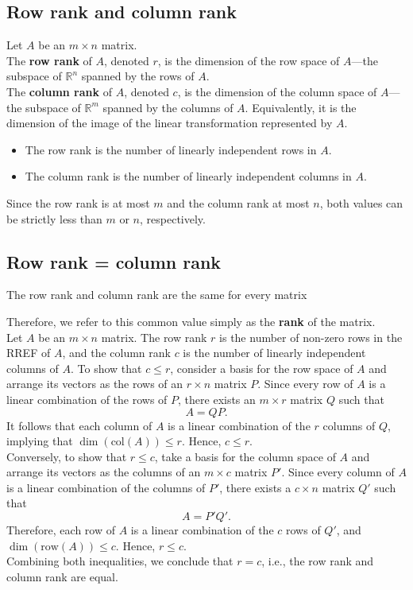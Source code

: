 \documentclass[a4paper, 9pt]{extarticle}
\begin{document}
\subsection{Row rank and column rank}
Let $A$ be an $m \times n$ matrix. \\[2ex]
The \textbf{row rank} of $A$, denoted $r$, is the dimension of the row space of $A$—the subspace of $\mathbb{R}^n$ spanned by the rows of $A$. \\[2ex]
The \textbf{column rank} of $A$, denoted $c$, is the dimension of the column space of $A$—the subspace of $\mathbb{R}^m$ spanned by the columns of $A$. Equivalently, it is the dimension of the image of the linear transformation represented by $A$.
\begin{itemize}
  \item The row rank is the number of linearly independent rows in $A$.
  \item The column rank is the number of linearly independent columns in $A$.
\end{itemize}
Since the row rank is at most $m$ and the column rank at most $n$, both values can be strictly less than $m$ or $n$, respectively.
\subsection{Row rank = column rank}
\begin{theorembox}{}{}
  The row rank and column rank are the same for every matrix
\end{theorembox}
\noindent
Therefore, we refer to this common value simply as the \textbf{rank} of the matrix. \\[2ex]
Let $A$ be an $m \times n$ matrix. The row rank $r$ is the number of non-zero rows in the RREF of $A$, and the column rank $c$ is the number of linearly independent columns of $A$.
To show that $c \leq r$, consider a basis for the row space of $A$ and arrange its vectors as the rows of an $r \times n$ matrix $P$. Since every row of $A$ is a linear combination of the rows of $P$, there exists an $m \times r$ matrix $Q$ such that
$$
  A = QP.
$$
It follows that each column of $A$ is a linear combination of the $r$ columns of $Q$, implying that $\dim(\text{col}(A)) \leq r$. Hence, $c \leq r$. \\
Conversely, to show that $r \leq c$, take a basis for the column space of $A$ and arrange its vectors as the columns of an $m \times c$ matrix $P'$. Since every column of $A$ is a linear combination of the columns of $P'$, there exists a $c \times n$ matrix $Q'$ such that
$$
  A = P'Q'.
$$
Therefore, each row of $A$ is a linear combination of the $c$ rows of $Q'$, and $\dim(\text{row}(A)) \leq c$. Hence, $r \leq c$. \\
Combining both inequalities, we conclude that $r = c$, i.e., the row rank and column rank are equal.
\end{document}
